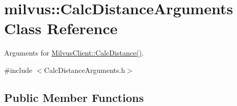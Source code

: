 \hypertarget{classmilvus_1_1_calc_distance_arguments}{}\section{milvus\+:\+:Calc\+Distance\+Arguments Class Reference}
\label{classmilvus_1_1_calc_distance_arguments}


Arguments for \hyperlink{classmilvus_1_1_milvus_client_a105c243c7d93ff2cd81b4d9c1751f5fb}{Milvus\+Client\+::\+Calc\+Distance()}.  




{\ttfamily \#include $<$Calc\+Distance\+Arguments.\+h$>$}

\subsection*{Public Member Functions}
